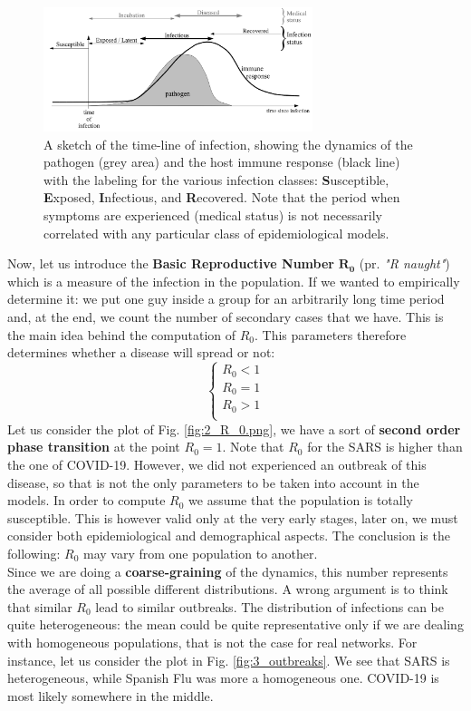 \documentclass[../main/main.tex]{subfiles}
\begin{document}
\begin{figure}[h!]
\centering
\includegraphics[width=0.7\textwidth]{../lessons/image/02/5.png}
\caption{\label{fig:2_5} A sketch of the time-line of infection, showing the dynamics of the pathogen (grey area) and the host immune response (black line) with the labeling for the various infection classes: \textbf{S}usceptible, \textbf{E}xposed, \textbf{I}nfectious, and \textbf{R}ecovered. Note that the period when symptoms are experienced (medical status) is not necessarily correlated with any particular class of epidemiological models.}
\end{figure}

Now, let us introduce the \textbf{Basic Reproductive Number} $\mathbf{R_0}$ (pr. \textit{"R naught"}) which is a measure of the infection in the population. If we wanted to empirically determine it: we put one guy inside a group for an arbitrarily long time period and, at the end, we count the number of secondary cases that we have. This is the main idea behind the computation of \( R_0 \). This parameters therefore determines whether a disease will spread or not:
  \begin{equation}
    \begin{cases}
     R_0 < 1\\
     R_0 = 1\\
     R_0 > 1\\
    \end{cases}
  \end{equation}
Let us consider the plot of Fig. \ref{fig:2_R_0.png}, we have a sort of \textbf{second order phase transition} at the point $R_0=1$.
Note that $R_0$ for the SARS is higher than the one of COVID-19. However, we did not experienced an outbreak of this disease, so that is not the only parameters to be taken into account in the models. In order to compute $R_0$ we assume that the population is totally susceptible. This is however valid only at the very early stages, later on, we must consider both epidemiological and demographical aspects. The conclusion is the following: $R_0$ may vary from one population to another.\\
Since we are doing a \textbf{coarse-graining} of the dynamics, this number represents the average of all possible different distributions. A wrong argument is to think that similar $R_0$ lead to similar outbreaks. The distribution of infections can be quite heterogeneous: the mean could be quite representative only if we are dealing with homogeneous populations, that is not the case for real networks. For instance, let us consider the plot in Fig. \ref{fig:3_outbreaks}. We see that SARS is heterogeneous, while Spanish Flu was more a homogeneous one. COVID-19 is most likely somewhere in the middle.
\end{document}
